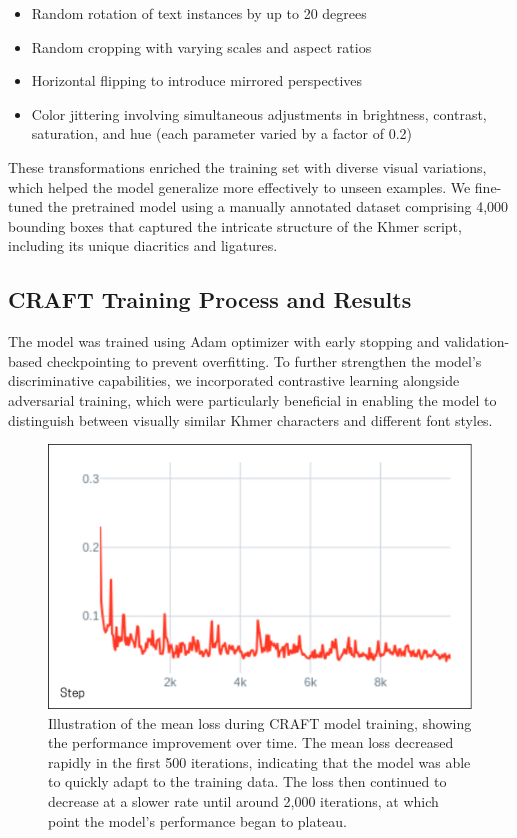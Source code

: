 \begin{itemize}
\item Random rotation of text instances by up to 20 degrees
\item Random cropping with varying scales and aspect ratios
\item Horizontal flipping to introduce mirrored perspectives
\item Color jittering involving simultaneous adjustments in brightness, contrast, saturation, and hue (each parameter varied by a factor of 0.2)
\end{itemize}

These transformations enriched the training set with diverse visual variations, which helped the model generalize more effectively to unseen examples. We fine-tuned the pretrained model using a manually annotated dataset comprising 4,000 bounding boxes that captured the intricate structure of the Khmer script, including its unique diacritics and ligatures.

\subsection{CRAFT Training Process and Results}
\label{subsec:craft-training-results}

The model was trained using Adam optimizer with early stopping and validation-based checkpointing to prevent overfitting. To further strengthen the model's discriminative capabilities, we incorporated contrastive learning alongside adversarial training, which were particularly beneficial in enabling the model to distinguish between visually similar Khmer characters and different font styles.

\begin{figure}[H]
    \centering
    \includegraphics[width=\textwidth]{figures/mean_loss_craft.png}
    \caption{Illustration of the mean loss during CRAFT model training, showing the performance 
    improvement over time. The mean loss decreased rapidly in the first 500 iterations, 
    indicating that the model was able to quickly adapt to the training data. The loss then 
    continued to decrease at a slower rate until around 2,000 iterations, at which point 
    the model's performance began to plateau.}
    \label{fig:mean-loss-craft}
\end{figure}

